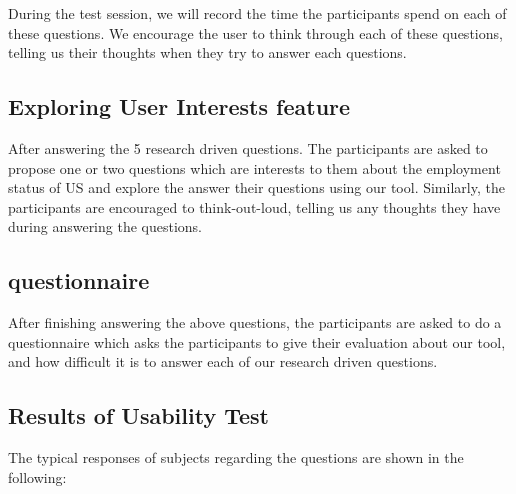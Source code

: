 \documentclass{sigchi}
\begin{document}
During the test session, we will record the time the participants spend on each of these questions. We encourage the user to think through each of these questions, telling us their thoughts when they try to answer each questions.

\subsection{Exploring User Interests feature}
After answering the 5 research driven questions. The participants are asked to propose one or two questions which are interests to them about the employment status of US and explore the answer their questions using our tool. Similarly, the participants are encouraged to think-out-loud, telling us any thoughts they have during answering the questions.

\subsection{questionnaire}
After finishing answering the above questions, the participants are asked to do a questionnaire which asks the participants to give their evaluation about our tool, and how difficult it is to answer each of our research driven questions.


\subsection{Results of Usability Test}
The typical responses of subjects regarding the questions are shown in the following:
\end{document}

